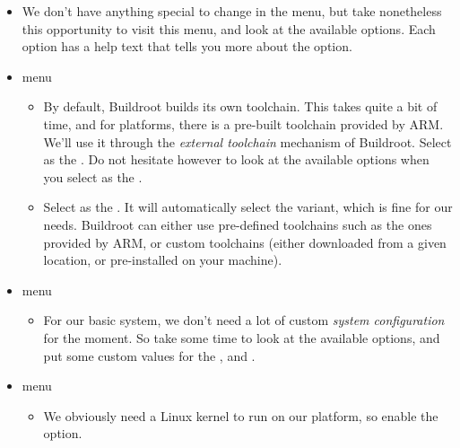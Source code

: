 \begin{itemize}
\item We don't have anything special to change in the
   menu, but take nonetheless this opportunity to
  visit this menu, and look at the available options. Each option has
  a help text that tells you more about the option.

\item {} menu

  \begin{itemize}

  \item By default, Buildroot builds its own toolchain. This takes
    quite a bit of time, and for  platforms, there is a
    pre-built toolchain provided by ARM. We'll use it through the
    {\em external toolchain} mechanism of Buildroot. Select
     as the . Do not
    hesitate however to look at the available options when you select
     as the .

  \item Select  as the . It
    will automatically select the  variant, which is fine for our
    needs. Buildroot can either use pre-defined toolchains such as the
    ones provided by ARM, or custom toolchains (either downloaded from
    a given location, or pre-installed on your machine).

  \end{itemize}

\item {} menu

  \begin{itemize}

  \item For our basic system, we don't need a lot of custom {\em
      system configuration} for the moment. So take some time to look
    at the available options, and put some custom values for the
    ,  and .

  \end{itemize}

\item {} menu

  \begin{itemize}

  \item We obviously need a Linux kernel to run on our platform, so
    enable the  option.


\end{itemize}
\end{itemize}
